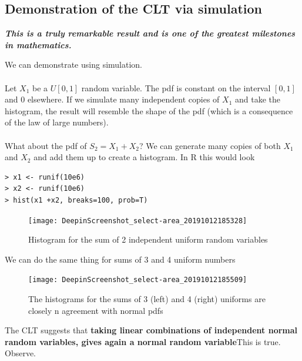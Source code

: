 \documentclass{report}
\theoremstyle{definition}
\theoremstyle{plain}
\newtheorem{theorem}{Theorem}
\theoremstyle{remark}
\begin{document}
\subsection{Demonstration of the CLT via simulation}
\begin{center}
\textbf{ \textit{This is a truly remarkable result and is one of the greatest
milestones in mathematics.}}
\end{center}
We can demonstrate using simulation.
\\\\
Let \( X_1 \) be a \( U[0,1] \) random variable. The pdf is constant on the
interval \( [0,1] \) and 0 elsewhere. If we simulate many independent copies of
\( X_1 \) and take the histogram, the result will resemble the shape of the pdf
(which is a consequence of the law of large numbers).
\\\\
What about the pdf of \( S_2 = X_1 + X_2 \)? We can generate many copies of
both \( X_1 \) and \( X_2 \) and add them up to create a histogram. In R this
would look 

\begin{lstlisting}
> x1 <- runif(10e6)
> x2 <- runif(10e6)
> hist(x1 +x2, breaks=100, prob=T)
\end{lstlisting}


\begin{figure}[httb]
  \centering
  \texttt{[image: DeepinScreenshot\_select-area\_20191012185328]}
  \caption{Histogram for the sum of 2 independent uniform random variables}%
  \label{}
\end{figure}

We can do the same thing for sums of 3 and 4 uniform numbers


\begin{figure}[httb]
  \centering
  \texttt{[image: DeepinScreenshot\_select-area\_20191012185509]}
  \caption{The histograms for the sums of 3 (left) and 4 (right) uniforms are
  closely n agreement with normal pdfs}%
  \label{}
\end{figure}
The CLT suggests that \textbf{taking linear combinations of independent normal
random variables, gives again a normal random variable}This is true. Observe.
\begin{center}
\end{center}
\end{document}
